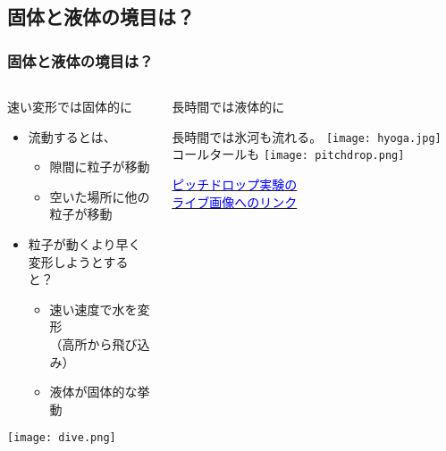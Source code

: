 \documentclass[12pt, dvipdfmx]{beamer}
\begin{document}
\subsection{固体と液体の境目は？}
\begin{frame}
	\frametitle{固体と液体の境目は？}
	\vspace{-5mm}
	\begin{columns}[T, onlytextwidth]
			\begin{alertblock}{速い変形では固体的に}
				\begin{itemize}
					\item 流動するとは、
					\begin{itemize}
						\item 隙間に粒子が移動
						\item 空いた場所に他の粒子が移動
					\end{itemize}
					\item 粒子が動くより早く変形しようとすると？
					\begin{itemize}
						\item 速い速度で水を変形\\（高所から飛び込み）
						\item 液体が固体的な挙動
					\end{itemize}
				\end{itemize}
				\vspace{-3mm}
					\begin{center}
						\texttt{[image: dive.png]}
					\end{center}
			\end{alertblock}
			\begin{exampleblock}{長時間では液体的に}
				\begin{center}
					長時間では氷河も流れる。
					\texttt{[image: hyoga.jpg]}
					コールタールも
					\texttt{[image: pitchdrop.png]}

					\href{https://livestream.com/accounts/4931571/events/5369913}{\textcolor{blue}{ピッチドロップ実験の\\ライブ画像へのリンク}}
				\end{center}
			\end{exampleblock}
	\end{columns}	
\end{frame}
\end{document}
